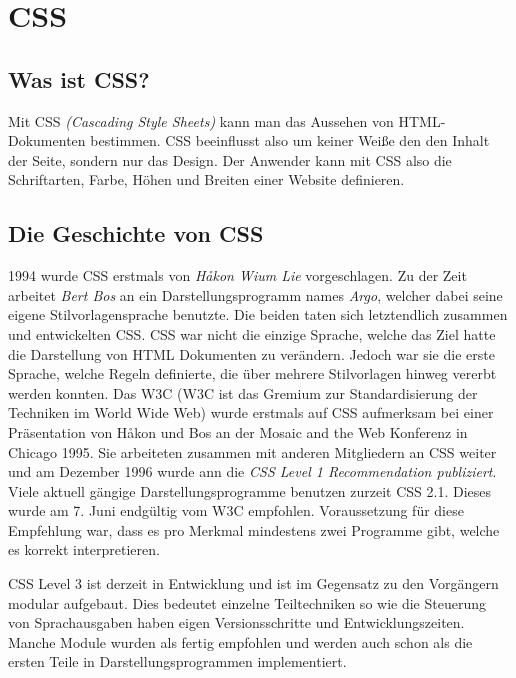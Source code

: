 \section{CSS}
\label{css}

\subsection{Was ist CSS?}
Mit CSS \textit{(Cascading Style Sheets)} kann man das Aussehen von HTML-Dokumenten bestimmen. CSS beeinflusst also um keiner Weiße den den Inhalt der Seite,
sondern nur das Design. Der Anwender kann mit CSS also die Schriftarten, Farbe, Höhen und Breiten einer Website definieren.

\subsection{Die Geschichte von CSS}
1994 wurde CSS erstmals von \textit{Håkon Wium Lie} vorgeschlagen. Zu der Zeit arbeitet \textit{Bert Bos} an ein Darstellungsprogramm names \textit{Argo}, welcher dabei
seine eigene Stilvorlagensprache benutzte. Die beiden taten sich letztendlich zusammen und entwickelten CSS. CSS war nicht die einzige Sprache, welche das Ziel hatte
die Darstellung von HTML Dokumenten zu verändern. Jedoch war sie die erste Sprache, welche Regeln definierte, die über mehrere Stilvorlagen hinweg vererbt werden konnten.
Das W3C (W3C ist das Gremium zur Standardisierung der Techniken im World Wide Web) wurde erstmals auf CSS aufmerksam bei einer Präsentation von Håkon und Bos an der \glqq Mosaic and the Web\grqq{} Konferenz
in Chicago 1995. Sie arbeiteten zusammen mit anderen Mitgliedern an CSS weiter und am Dezember 1996 wurde ann die \textit{CSS Level 1 Recommendation publiziert}.
Viele aktuell gängige Darstellungsprogramme benutzen zurzeit CSS 2.1. Dieses wurde am 7. Juni endgültig vom W3C empfohlen. Voraussetzung für diese Empfehlung war, dass es 
pro Merkmal mindestens zwei Programme gibt, welche es korrekt interpretieren.


CSS Level 3 ist derzeit in Entwicklung und ist im Gegensatz zu den Vorgängern modular aufgebaut. Dies bedeutet einzelne Teiltechniken so wie die Steuerung von Sprachausgaben
haben eigen Versionsschritte und Entwicklungszeiten. Manche Module wurden als fertig empfohlen und werden auch schon als die ersten Teile in Darstellungsprogrammen implementiert.
~\cite{CSS}